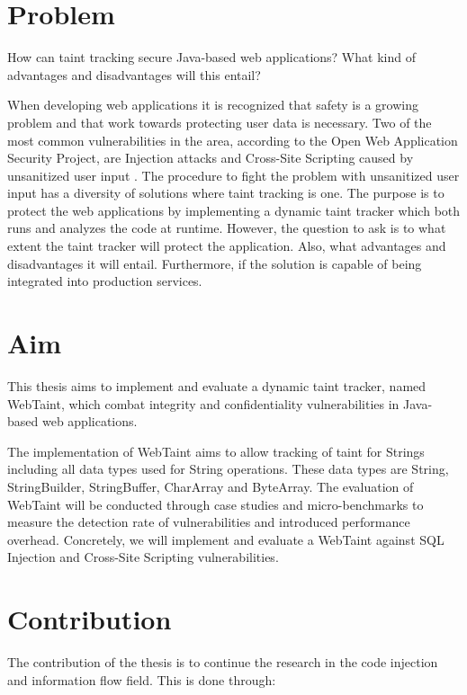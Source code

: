 \section{Problem}
\label{Problem}
\begin{chapquote}{}
    How can taint tracking secure Java-based web applications? What kind of advantages and disadvantages will this entail?
\end{chapquote}

\noindent
When developing web applications it is recognized that safety is a growing problem and that work towards protecting user data is necessary. Two of the most common vulnerabilities in the area, according to the Open Web Application Security Project, are Injection attacks and Cross-Site Scripting caused by unsanitized user input \parencite{OWASP2017}. The procedure to fight the problem with unsanitized user input has a diversity of solutions where taint tracking is one. The purpose is to protect the web applications by implementing a dynamic taint tracker which both runs and analyzes the code at runtime. However, the question to ask is to what extent the taint tracker will protect the application. Also, what advantages and disadvantages it will entail. Furthermore, if the solution is capable of being integrated into production services.



\section{Aim}
\label{Aim}
This thesis aims to implement and evaluate a dynamic taint tracker, named WebTaint, which combat integrity and confidentiality vulnerabilities in Java-based web applications. 

The implementation of WebTaint aims to allow tracking of taint for Strings including all data types used for String operations. These data types are String, StringBuilder, StringBuffer, CharArray and ByteArray. The evaluation of WebTaint will be conducted through case studies and micro-benchmarks to measure the detection rate of vulnerabilities and introduced performance overhead. Concretely, we will implement and evaluate a WebTaint against SQL Injection and Cross-Site Scripting vulnerabilities.



\section{Contribution}
\label{Contribution}
The contribution of the thesis is to continue the research in the code injection and information flow field. This is done through:

